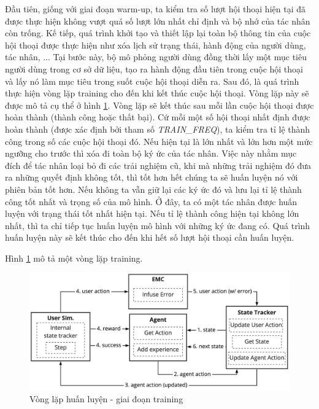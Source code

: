 Đầu tiên, giống với giai đoạn warm-up, ta kiểm tra số lượt hội thoại hiện tại đã được thực hiện không vượt quá số lượt lớn nhất chỉ định và bộ nhớ của tác nhân còn trống. Kế tiếp, quá trình khởi tạo và thiết lập lại toàn bộ thông tin của cuộc hội thoại được thực hiện như xóa lịch sử trạng thái, hành động của người dùng, tác nhân, ... Tại bước này, bộ mô phỏng người dùng đồng thời lấy một mục tiêu người dùng trong cơ sở dữ liệu, tạo ra hành động đầu tiên trong cuộc hội thoại và lấy nó làm mục tiêu trong suốt cuộc hội thoại diễn ra. Sau đó, là quá trình thực hiện vòng lặp training cho đến khi kết thúc cuộc hội thoại. Vòng lặp này sẽ được mô tả cụ thể ở hình \ref{fig:training}. Vòng lặp sẽ kết thúc sau mỗi lần cuộc hội thoại được hoàn thành (thành công hoặc thất bại). Cứ mỗi một số hội thoại nhất định được hoàn thành (được xác định bởi tham số \textit{TRAIN\_FREQ}), ta kiểm tra tỉ lệ thành công trong số các cuộc hội thoại đó. Nếu hiện tại là lớn nhất và lớn hơn một mức ngưỡng cho trước thì xóa đi toàn bộ ký ức của tác nhân. Việc này nhằm mục đích để tác nhân loại bỏ đi các trải nghiệm cũ, khi mà những trải nghiệm đó đưa ra những quyết định không tốt, thì tốt hơn hết chúng ta sẽ huấn luyện nó với phiên bản tốt hơn. Nếu không ta vẫn giữ lại các ký ức đó và lưu lại tỉ lệ thành công tốt nhất và trọng số của mô hình. Ở đây, ta có một tác nhân được huấn luyện với trạng thái tốt nhất hiện tại. Nếu tỉ lệ thành công hiện tại không lớn nhất, thì ta chỉ tiếp tục huấn luyện mô hình với những ký ức đang có. Quá trình huấn luyện này sẽ kết thúc cho đến khi hết số lượt hội thoại cần huấn luyện.

\clearpage

Hình \ref{fig:training} mô tả một vòng lặp training.

\begin{center}
    \begin{figure}[h!]
        \begin{center}
         \includegraphics[scale=0.145]{chapter4/img/training.jpg}
        \end{center}
        \caption{Vòng lặp huấn luyện - giai đoạn training}
        \label{fig:training}
    \end{figure}
\end{center}

